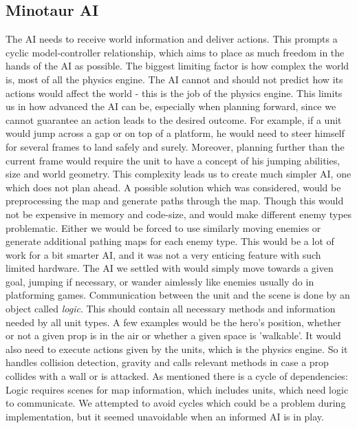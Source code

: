 \subsection{Minotaur AI} %
The AI needs to receive world information and deliver actions. This prompts a cyclic model-controller relationship, which aims to place as much freedom in the hands of the AI as possible. The biggest limiting factor is how complex the world is, most of all the physics engine. The AI cannot and should not predict how its actions would affect the world - this is the job of the physics engine. This limits us in how advanced the AI can be, especially when planning forward, since we cannot guarantee an action leads to the desired outcome. For example, if a unit would jump across a gap or on top of a platform, he would need to steer himself for several frames to land safely and surely. Moreover, planning further than the current frame would require the unit to have a concept of his jumping abilities, size and world geometry.
\newline
This complexity leads us to create much simpler AI, one which does not plan ahead. A possible solution which was considered, would be preprocessing the map and generate paths through the map. Though this would not be expensive in memory and code-size, and would make different enemy types problematic. Either we would be forced to use similarly moving enemies or generate additional pathing maps for each enemy type. This would be a lot of work for a bit smarter AI, and it was not a very enticing feature with such limited hardware.
\newline
The AI we settled with would simply move towards a given goal, jumping if necessary, or wander aimlessly like enemies usually do in platforming games.
\newline
Communication between the unit and the scene is done by an object called \emph{logic}. This should contain all necessary methods and information needed by all unit types. A few examples would be the hero's position, whether or not a given prop is in the air or whether a given space is 'walkable'. It would also need to execute actions given by the units, which is the physics engine. So it handles collision detection, gravity and calls relevant methods in case a prop collides with a wall or is attacked.
\newline
As mentioned there is a cycle of dependencies: Logic requires scenes for map information, which includes units, which need logic to communicate. We attempted to avoid cycles which could be a problem during implementation, but it seemed unavoidable when an informed AI is in play.

